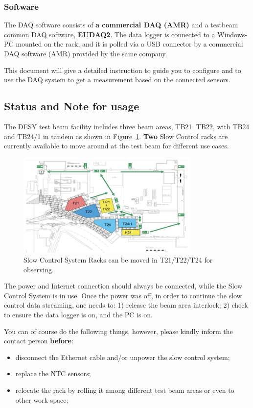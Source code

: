 \documentclass[a4paper,12pt]{scrartcl}
\begin{document}
\subsubsection*{Software}
The DAQ software consists of \textbf{a commercial DAQ (AMR)} and a testbeam common DAQ software, \textbf{EUDAQ2}.
The data logger is connected to a Windows-PC mounted on the rack, and it is polled via a USB connector by a commercial DAQ software (AMR) provided by the same company.

This document will give a detailed instruction to guide you to configure and to use the DAQ system to get a measurement based on the connected sensors.

\subsection{Status and Note for usage}
The DESY test beam facility includes three beam areas, TB21, TB22, with TB24 and TB24/1 in tandem as shown in Figure~\ref{fig:desytb}. \textbf{Two} Slow Control racks are currently available to move around at the test beam for different use cases.

\begin{figure}[!ht]
  \centering
  \includegraphics[width=0.8\textwidth]{figs/Testbeam.png}
\caption{Slow Control System Racks can be moved in T21/T22/T24 for observing.}
\label{fig:desytb}
\end{figure}

The power and Internet connection should always be connected, while the Slow Control System is in use. Once the power was off, in order to continue the slow control data streaming, one needs to: 1) release the beam area interlock; 2) check to ensure the data logger is on, and the PC is on.

You can of course do the following things, however, please kindly inform the contact person \textbf{before}:
\begin{itemize}
  \item disconnect the Ethernet cable and/or unpower the slow control system;
  \item replace the NTC sensors;
  \item relocate the rack by rolling it among different test beam areas or even to other work space;
\end{itemize}
\end{document}
